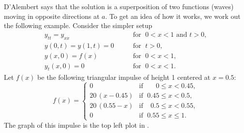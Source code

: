 \begin{example} \label{dalemb:impulsexample}
D'Alembert says that the solution is a superposition of
two functions (waves) moving in opposite directions at  $a$.
To get an idea of
how it works, we work out the following example.
Consider the simpler setup
\begin{equation*}
\begin{array}{ll}
y_{tt} = y_{xx} & \qquad \text{for } \; 0 < x < 1 \text{ and } t > 0, \\
y(0,t) = y(1,t) = 0 & \qquad \text{for } \; t > 0, \\
y(x,0) = f(x)  & \qquad \text{for } \; 0 < x < 1, \\
y_t(x,0) = 0   & \qquad \text{for } \; 0 < x < 1 .
\end{array}
\end{equation*}
Let $f(x)$ be the following triangular impulse of height 1 centered at $x=0.5$:
\begin{equation*}
f(x) =
\begin{cases}
0 & \text{if } \; \phantom{0.5}0 \leq x < 0.45, \\
20\,(x-0.45) & \text{if } \; 0.45 \leq x < 0.5, \\
20\,(0.55-x) & \text{if } \; \phantom{5}0.5 \leq x < 0.55, \\
0 & \text{if } \; 0.55 \leq x \leq 1 .
\end{cases}
\end{equation*}
The graph of this impulse is the top left plot in
.


\end{example}
